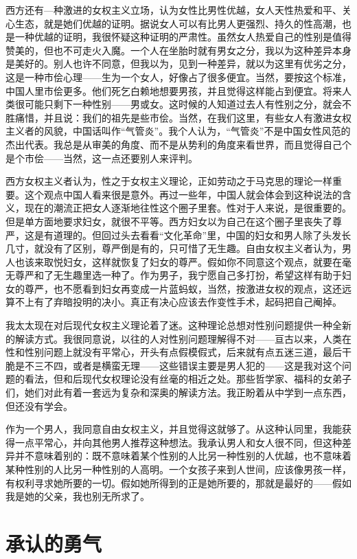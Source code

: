 西方还有—种激进的女权主义立场，认为女性比男性优越，女人天性热爱和平、关心生态，就是她们优越的证明。据说女人可以有比男人更强烈、持久的性高潮，也是一种优越的证明，我很怀疑这种证明的严肃性。虽然女人热爱自己的性别是值得赞美的，但也不可走火入魔。一个人在坐胎时就有男女之分，我以为这种差异本身是美好的。别人也许不同意，但我以为，见到一种差异，就以为这里有优劣之分，这是一种市侩心理——生为一个女人，好像占了很多便宜。当然，要按这个标准，中国人里市侩更多。他们死乞白赖地想要男孩，并且觉得这样能占到便宜。将来人类很可能只剩下一种性别——男或女。这时候的人知道过去人有性别之分，就会不胜痛惜，并且说：我们的祖先是些市侩。当然，在我们这里，有些女人有激进女权主义者的风貌，中国话叫作“气管炎”。我个人认为，“气管炎”不是中国女性风范的杰出代表。我总是从审美的角度、而不是从势利的角度来看世界，而且觉得自己个是个市侩——当然，这一点还要别人来评判。 

西方女权主义者认为，性之于女权主义理论，正如劳动之于马克思的理论一样重要。这个观点中国人看来很是意外。再过一些年，中国人就会体会到这种说法的含义，现在的潮流正把女人逐渐地往性这个圈子里套。性对于人来说，是很重要的。但是单方面地要求妇女，就很不平等。西方妇女以为自己在这个圈子里丧失了尊严，这是有道理的。但回过头去看看“文化革命”里，中国的妇女和男人除了头发长几寸，就没有了区别，尊严倒是有的，只可惜了无生趣。自由女权主义者认为，男人也该来取悦妇女，这样就恢复了妇女的尊严。假如你不同意这个观点，就要在毫无尊严和了无生趣里选一种了。作为男子，我宁愿自己多打扮，希望这样有助于妇女的尊严，也不愿看到妇女再变成一片蓝蚂蚁，当然，按激进女权的观点，这还远算不上有了弃暗投明的决小。真正有决心应该去作变性手术，起码把自己阉掉。 

我太太现在对后现代女权主义理论着了迷。这种理论总想对性别问题提供一种全新的解读方式。我很同意说，以往的人对性别问题理解得不对——亘古以来，人类在性和性别问题上就没有平常心，开头有点假模假式，后来就有点五迷三道，最后干脆是不三不四，或者是横蛮无理——这些错误主要是男人犯的——这是我对这个问题的看法，但和后现代女权理论没有丝毫的相近之处。那些哲学家、福科的女弟子们，她们对此有着一套远为复杂和深奥的解读方法。我正盼着从中学到一点东西，但还没有学会。 

作为一个男人，我同意自由女权主义，并且觉得这就够了。从这种认同里，我能获得一点平常心，并向其他男人推荐这种想法。我承认男人和女人很不同，但这种差异并不意味着别的：既不意味着某个性别的人比另一种性别的人优越，也不意味着某种性别的人比另一种性别的人高明。一个女孩子来到人世间，应该像男孩一样，有权利寻求她所要的一切。假如她所得到的正是她所要的，那就是最好的——假如我是她的父亲，我也别无所求了。
 
\chapter{承认的勇气}

